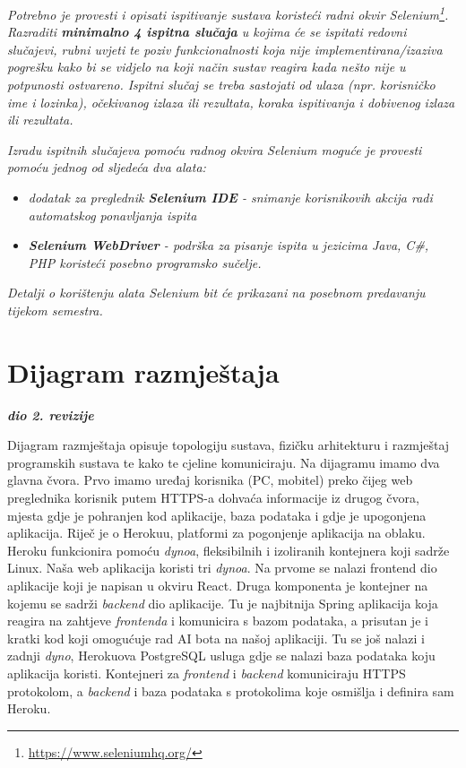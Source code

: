 			 \textit{Potrebno je provesti i opisati ispitivanje sustava koristeći radni okvir Selenium\footnote{\url{https://www.seleniumhq.org/}}. Razraditi \textbf{minimalno 4 ispitna slučaja} u kojima će se ispitati redovni slučajevi, rubni uvjeti te poziv funkcionalnosti koja nije implementirana/izaziva pogrešku kako bi se vidjelo na koji način sustav reagira kada nešto nije u potpunosti ostvareno. Ispitni slučaj se treba sastojati od ulaza (npr. korisničko ime i lozinka), očekivanog izlaza ili rezultata, koraka ispitivanja i dobivenog izlaza ili rezultata.\\ }
			 
			 \textit{Izradu ispitnih slučajeva pomoću radnog okvira Selenium moguće je provesti pomoću jednog od sljedeća dva alata:}
			 \begin{itemize}
			 	\item \textit{dodatak za preglednik \textbf{Selenium IDE} - snimanje korisnikovih akcija radi automatskog ponavljanja ispita	}
			 	\item \textit{\textbf{Selenium WebDriver} - podrška za pisanje ispita u jezicima Java, C\#, PHP koristeći posebno programsko sučelje.}
			 \end{itemize}
		 	\textit{Detalji o korištenju alata Selenium bit će prikazani na posebnom predavanju tijekom semestra.}
			
			\eject 
		
		
		\section{Dijagram razmještaja}
			
			\textbf{\textit{dio 2. revizije}}
			
			Dijagram razmještaja opisuje topologiju sustava, fizičku arhitekturu i razmještaj programskih sustava te kako te cjeline komuniciraju. Na dijagramu imamo dva glavna čvora. Prvo imamo uređaj korisnika (PC, mobitel) preko čijeg web preglednika korisnik putem HTTPS-a dohvaća informacije iz drugog čvora, mjesta gdje je pohranjen kod aplikacije, baza podataka i gdje je upogonjena aplikacija. Riječ je o Herokuu, platformi za pogonjenje aplikacija na oblaku. Heroku funkcionira pomoću \textit{dynoa}, fleksibilnih i izoliranih kontejnera koji sadrže Linux. Naša web aplikacija koristi tri \textit{dynoa}. Na prvome se nalazi frontend dio aplikacije koji je napisan u okviru React. Druga komponenta je kontejner na kojemu se sadrži \textit{backend} dio aplikacije. Tu je najbitnija Spring aplikacija koja reagira na zahtjeve \textit{frontenda} i komunicira s bazom podataka, a prisutan je i kratki kod koji omogućuje rad AI bota na našoj aplikaciji. Tu se još nalazi i zadnji \textit{dyno}, Herokuova PostgreSQL usluga gdje se nalazi baza podataka koju aplikacija koristi. Kontejneri za \textit{frontend} i \textit{backend} komuniciraju HTTPS protokolom, a \textit{backend} i baza podataka s protokolima koje osmišlja i definira sam Heroku.


